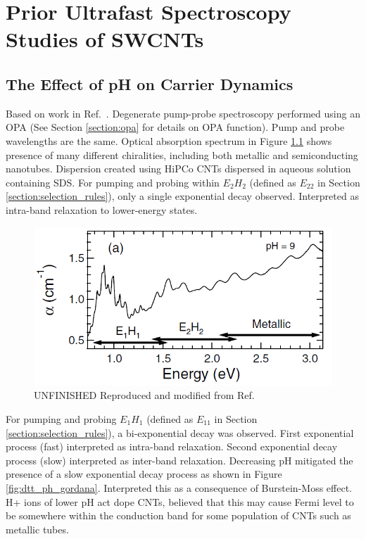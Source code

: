 \chapter{Prior Ultrafast Spectroscopy Studies of SWCNTs}

\section{The Effect of pH on Carrier Dynamics}

Based on work in Ref.\ \cite{ostojic2004interband}. Degenerate pump-probe spectroscopy performed using an OPA (See Section \ref{section:opa} for details on OPA function). Pump and probe wavelengths are the same. Optical absorption spectrum in Figure \ref{fig:abs_gordana} shows presence of many different chiralities, including both metallic and semiconducting nanotubes. Dispersion created using HiPCo CNTs dispersed in aqueous solution containing SDS. For pumping and probing within $E_2 H_2$ (defined as $E_{22}$ in Section \ref{section:selection_rules}), only a single exponential decay observed. Interpreted as intra-band relaxation to lower-energy states.
\begin{figure}[ht]
	\centering
	\includegraphics[scale=0.7]{images/chapter_prior_works/abs_gordana}
	\caption{{\color{red} UNFINISHED } Reproduced and modified from Ref.\ \cite{ostojic2004interband}}
	\label{fig:abs_gordana}
\end{figure}

For pumping and probing $E_1 H_1$ (defined as $E_{11}$ in Section \ref{section:selection_rules}), a bi-exponential decay was observed. First exponential process (fast) interpreted as intra-band relaxation. Second exponential decay process (slow) interpreted as inter-band relaxation. Decreasing pH mitigated the presence of a slow exponential decay process as shown in Figure \ref{fig:dtt_ph_gordana}. Interpreted this as a consequence of Burstein-Moss effect. H+ ions of lower pH act dope CNTs, believed that this may cause Fermi level to be somewhere within the conduction band for some population of CNTs such as metallic tubes.

